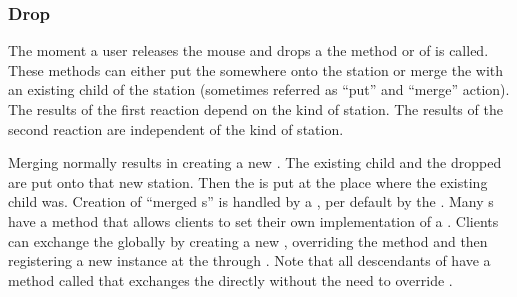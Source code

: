 

\subsubsection{Drop}
The moment a user releases the mouse and drops a  the method  or  of  is called. These methods can either put the  somewhere onto the station or merge the  with an existing child of the station (sometimes referred as ``put'' and ``merge'' action). The results of the first reaction depend on the kind of station. The results of the second reaction are independent of the kind of station.

Merging normally results in creating a new . The existing child and the dropped  are put onto that new station. Then the  is put at the place where the existing child was. Creation of ``merged s'' is handled by a , per default by the . Many s have a method that allows clients to set their own implementation of a . Clients can exchange the  globally by creating a new , overriding the method  and then registering a new instance at the  through . Note that all descendants of  have a method called  that exchanges the  directly without the need to override .


